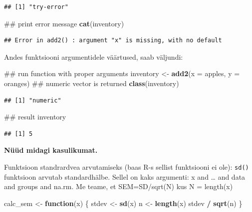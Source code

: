 \documentclass[]{book}
\newenvironment{Shaded}{\begin{snugshade}}{\end{snugshade}}
\newcommand{\KeywordTok}[1]{\textcolor[rgb]{0.13,0.29,0.53}{\textbf{#1}}}
\newcommand{\DataTypeTok}[1]{\textcolor[rgb]{0.13,0.29,0.53}{#1}}
\newcommand{\StringTok}[1]{\textcolor[rgb]{0.31,0.60,0.02}{#1}}
\newcommand{\ControlFlowTok}[1]{\textcolor[rgb]{0.13,0.29,0.53}{\textbf{#1}}}
\newcommand{\OperatorTok}[1]{\textcolor[rgb]{0.81,0.36,0.00}{\textbf{#1}}}
\newcommand{\NormalTok}[1]{#1}
\begin{document}
\begin{verbatim}
## [1] "try-error"
\end{verbatim}

\begin{Shaded}
\begin{Highlighting}[]
\NormalTok{## print error message}
\KeywordTok{cat}\NormalTok{(inventory)}
\end{Highlighting}
\end{Shaded}

\begin{verbatim}
## Error in add2() : argument "x" is missing, with no default
\end{verbatim}

Andes funktsiooni argumentidele väärtused, saab väljundi:

\begin{Shaded}
\begin{Highlighting}[]
\NormalTok{## run function with proper arguments}
\NormalTok{inventory <-}\StringTok{ }\KeywordTok{add2}\NormalTok{(}\DataTypeTok{x =}\NormalTok{ apples, }\DataTypeTok{y =}\NormalTok{ oranges)}
\NormalTok{## numeric vector is returned}
\KeywordTok{class}\NormalTok{(inventory)}
\end{Highlighting}
\end{Shaded}

\begin{verbatim}
## [1] "numeric"
\end{verbatim}

\begin{Shaded}
\begin{Highlighting}[]
\NormalTok{## result}
\NormalTok{inventory}
\end{Highlighting}
\end{Shaded}

\begin{verbatim}
## [1] 5
\end{verbatim}

\textbf{Nüüd midagi kasulikumat.}

Funktsioon standrardvea arvutamiseks (baas R-s sellist funktsiooni ei
ole): \texttt{sd()} funktsioon arvutab standardhälbe. Sellel on kaks
argumenti: x and \ldots{} and data and groups and na.rm. Me teame, et
SEM=SD/sqrt(N) kus N = length(x)

\begin{Shaded}
\begin{Highlighting}[]
\NormalTok{calc_sem <-}\StringTok{ }\ControlFlowTok{function}\NormalTok{(x) \{}
\NormalTok{  stdev <-}\StringTok{ }\KeywordTok{sd}\NormalTok{(x)}
\NormalTok{  n <-}\StringTok{ }\KeywordTok{length}\NormalTok{(x)}
\NormalTok{  stdev }\OperatorTok{/}\StringTok{ }\KeywordTok{sqrt}\NormalTok{(n)}
\NormalTok{\}}
\end{Highlighting}
\end{Shaded}
\end{document}
